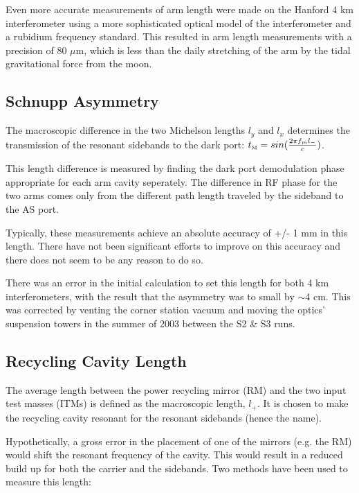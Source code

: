 Even more accurate measurements of arm length were made on the Hanford 4 km
interferometer \cite{Rick:ArmLengths} using a more sophisticated optical model
of the interferometer and a rubidium frequency standard. This resulted in
arm length measurements with a precision of 80 $\mu$m, which is less than the
daily stretching of the arm by the tidal gravitational force from the moon.


\subsection{Schnupp Asymmetry}

The macroscopic difference in the two Michelson lengths $l_y$ and $l_x$ determines
the transmission of the resonant sidebands to the dark port: 
$t_{\mbox{\tiny M}} = sin(\frac{2 \pi f_m l_-}{c})$.

This length difference is measured by finding the dark port demodulation phase 
appropriate for each arm cavity seperately. The difference in RF phase for
the two arms comes only from the different path length traveled by the sideband
to the AS port.

Typically, these measurements achieve an absolute accuracy of +/- 1 mm in this
length. There have not been significant efforts to improve on this accuracy and
there does not seem to be any reason to do so.

There was an error in the initial calculation to set this length for both 4 km
interferometers, with the result that the asymmetry was to small by $\sim$4 cm.
This was corrected by venting the corner station vacuum and moving the optics'
suspension towers in the summer of 2003 between the S2 \& S3 runs.


\subsection{Recycling Cavity Length}

The average length between the power recycling mirror (RM) and the two
input test masses (ITMs) is defined as the macroscopic length, $l_+$.
It is chosen to make the recycling cavity resonant for the resonant
sidebands (hence the name).

Hypothetically, a gross error in the placement of one of the mirrors
(e.g. the RM) would shift the resonant frequency of the cavity. This would
result in a reduced build up for both the carrier and the sidebands. Two
methods have been used to measure this length:

